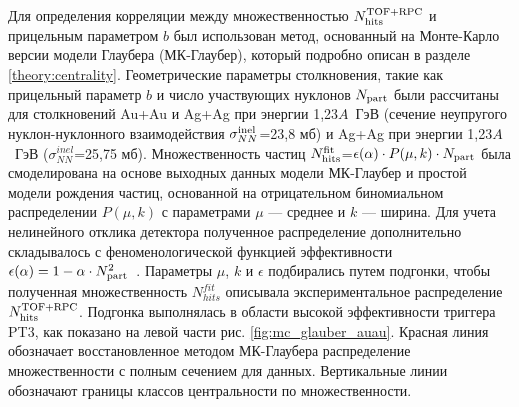 Для определения корреляции между множественностью $N_{\rm hits}^{\rm TOF+RPC}$ и прицельным параметром $b$ был использован метод, основанный на Монте-Карло версии модели Глаубера (МК-Глаубер), который подробно описан в разделе \ref{theory:centrality}.
Геометрические параметры столкновения, такие как прицельный параметр $b$ и число участвующих нуклонов $N_{\rm part}$ были рассчитаны для  столкновений Au+Au и  Ag+Ag при энергии 1,23$A$~ГэВ (сечение неупругого нуклон-нуклонного взаимодействия $\sigma_{NN}^{\rm inel}$=23,8 мб) и Ag+Ag при энергии 1,23$A$~ГэВ ($\sigma_{NN}^{inel}$=25,75 мб).  
Множественность частиц $N_{\rm hits}^{\rm fit}$=$\epsilon(\alpha)\cdot P(\mu,k)\cdot N_{\rm part}$ была смоделирована на основе выходных данных модели МК-Глаубер и простой модели  рождения частиц, основанной на отрицательном биномиальном распределении  $P(\mu,k)$ с параметрами $\mu$ --- среднее и $k$ --- ширина. 
Для учета нелинейного отклика детектора полученное распределение дополнительно складывалось с феноменологической функцией эффективности $\epsilon(\alpha) = 1 - \alpha\cdot N_{\rm part}^2$~\cite{HADES:2017def}.
Параметры $\mu$, $k$ и  $\epsilon$ подбирались путем подгонки, чтобы полученная множественность $N_{hits}^{fit}$ описывала экспериментальное распределение  $N_{\rm hits}^{\rm TOF+RPC}$. 
Подгонка выполнялась в области высокой эффективности триггера PT3, как показано на левой части рис. \ref{fig:mc_glauber_auau}.
Красная линия обозначает восстановленное методом МК-Глаубера распределение множественности с полным сечением для данных.
Вертикальные линии обозначают границы классов центральности по множественности.
